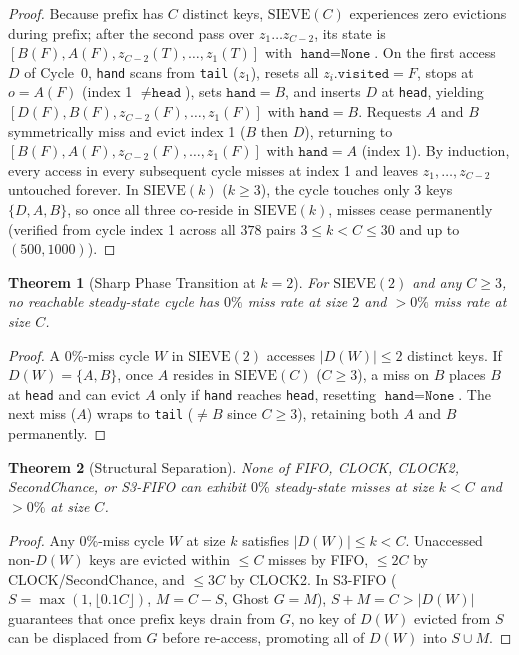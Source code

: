 \documentclass[10pt,twocolumn]{article}
\newtheorem{theorem}{Theorem}
\begin{document}
\begin{proof}
Because $\mathrm{prefix}$ has $C$ distinct keys, $\mathrm{SIEVE}(C)$ experiences zero evictions during $\mathrm{prefix}$; after the second pass over $z_1\dots z_{C-2}$, its state is $[B(F), A(F), z_{C-2}(T), \dots, z_1(T)]$ with $\texttt{hand} = \texttt{None}$. On the first access $D$ of Cycle~0, \texttt{hand} scans from \texttt{tail} ($z_1$), resets all $z_i.\texttt{visited} = F$, stops at $o = A(F)$ (index 1 $\ne \texttt{head}$), sets $\texttt{hand} = B$, and inserts $D$ at \texttt{head}, yielding $[D(F), B(F), z_{C-2}(F), \dots, z_1(F)]$ with $\texttt{hand} = B$. Requests $A$ and $B$ symmetrically miss and evict index 1 ($B$ then $D$), returning to $[B(F), A(F), z_{C-2}(F), \dots, z_1(F)]$ with $\texttt{hand} = A$ (index 1). By induction, every access in every subsequent cycle misses at index 1 and leaves $z_1,\dots,z_{C-2}$ untouched forever. In $\mathrm{SIEVE}(k)$ ($k \ge 3$), the cycle touches only 3 keys $\{D,A,B\}$, so once all three co-reside in $\mathrm{SIEVE}(k)$, misses cease permanently (verified from cycle index 1 across all $378$ pairs $3 \le k < C \le 30$ and up to $(500,1000)$).
\end{proof}

\begin{theorem}[Sharp Phase Transition at $k=2$]
For $\mathrm{SIEVE}(2)$ and any $C \ge 3$, no reachable steady-state cycle has $0\%$ miss rate at size $2$ and $>0\%$ miss rate at size $C$.
\end{theorem}

\begin{proof}
A $0\%$-miss cycle $W$ in $\mathrm{SIEVE}(2)$ accesses $|D(W)| \le 2$ distinct keys. If $D(W) = \{A,B\}$, once $A$ resides in $\mathrm{SIEVE}(C)$ ($C \ge 3$), a miss on $B$ places $B$ at \texttt{head} and can evict $A$ only if \texttt{hand} reaches \texttt{head}, resetting $\texttt{hand}=\texttt{None}$. The next miss ($A$) wraps to \texttt{tail} ($\ne B$ since $C \ge 3$), retaining both $A$ and $B$ permanently.
\end{proof}

\begin{theorem}[Structural Separation]
None of FIFO, CLOCK, CLOCK2, SecondChance, or S3-FIFO can exhibit $0\%$ steady-state misses at size $k < C$ and $>0\%$ at size $C$.
\end{theorem}

\begin{proof}
Any $0\%$-miss cycle $W$ at size $k$ satisfies $|D(W)| \le k < C$. Unaccessed non-$D(W)$ keys are evicted within $\le C$ misses by FIFO, $\le 2C$ by CLOCK/SecondChance, and $\le 3C$ by CLOCK2. In S3-FIFO ($S = \max(1,\lfloor 0.1 C\rfloor)$, $M = C-S$, Ghost $G = M$), $S + M = C > |D(W)|$ guarantees that once prefix keys drain from $G$, no key of $D(W)$ evicted from $S$ can be displaced from $G$ before re-access, promoting all of $D(W)$ into $S \cup M$.
\end{proof}
\end{document}
